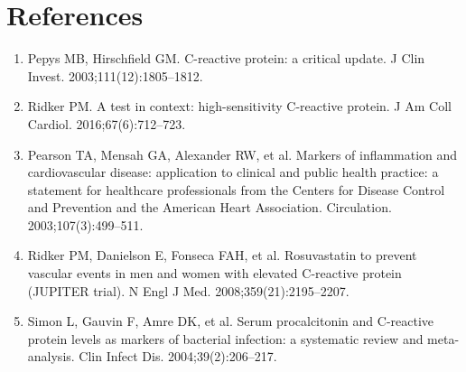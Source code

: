 \section*{References}
\begin{enumerate}
  \item Pepys MB, Hirschfield GM. C-reactive protein: a critical update. J Clin Invest. 2003;111(12):1805--1812.
  \item Ridker PM. A test in context: high-sensitivity C-reactive protein. J Am Coll Cardiol. 2016;67(6):712--723.
  \item Pearson TA, Mensah GA, Alexander RW, et al. Markers of inflammation and cardiovascular disease: application to clinical and public health practice: a statement for healthcare professionals from the Centers for Disease Control and Prevention and the American Heart Association. Circulation. 2003;107(3):499--511.
  \item Ridker PM, Danielson E, Fonseca FAH, et al. Rosuvastatin to prevent vascular events in men and women with elevated C-reactive protein (JUPITER trial). N Engl J Med. 2008;359(21):2195--2207.
  \item Simon L, Gauvin F, Amre DK, et al. Serum procalcitonin and C-reactive protein levels as markers of bacterial infection: a systematic review and meta-analysis. Clin Infect Dis. 2004;39(2):206--217.
\end{enumerate}

\clearpage
